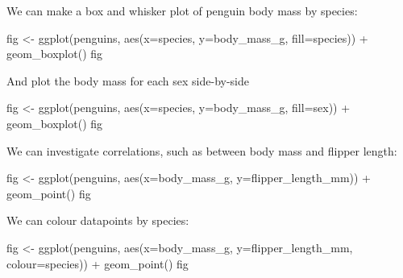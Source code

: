 \documentclass[
  letterpaper,
  DIV=11,
  numbers=noendperiod]{scrreprt}
\newenvironment{Shaded}{\begin{snugshade}}{\end{snugshade}}
\newcommand{\AttributeTok}[1]{\textcolor[rgb]{0.40,0.45,0.13}{#1}}
\newcommand{\FunctionTok}[1]{\textcolor[rgb]{0.28,0.35,0.67}{#1}}
\newcommand{\NormalTok}[1]{\textcolor[rgb]{0.00,0.23,0.31}{#1}}
\newcommand{\OtherTok}[1]{\textcolor[rgb]{0.00,0.23,0.31}{#1}}
\newcommand{\SpecialCharTok}[1]{\textcolor[rgb]{0.37,0.37,0.37}{#1}}
\begin{document}
\begin{tcolorbox}
We can make a box and whisker plot of penguin body mass by species:

\begin{Shaded}
\begin{Highlighting}[]
\NormalTok{fig }\OtherTok{\textless{}{-}} \FunctionTok{ggplot}\NormalTok{(penguins, }\FunctionTok{aes}\NormalTok{(}\AttributeTok{x=}\NormalTok{species, }\AttributeTok{y=}\NormalTok{body\_mass\_g, }\AttributeTok{fill=}\NormalTok{species)) }\SpecialCharTok{+}
         \FunctionTok{geom\_boxplot}\NormalTok{()}
\NormalTok{fig}
\end{Highlighting}
\end{Shaded}

And plot the body mass for each sex side-by-side

\begin{Shaded}
\begin{Highlighting}[]
\NormalTok{fig }\OtherTok{\textless{}{-}} \FunctionTok{ggplot}\NormalTok{(penguins, }\FunctionTok{aes}\NormalTok{(}\AttributeTok{x=}\NormalTok{species, }\AttributeTok{y=}\NormalTok{body\_mass\_g, }\AttributeTok{fill=}\NormalTok{sex)) }\SpecialCharTok{+}
         \FunctionTok{geom\_boxplot}\NormalTok{()}
\NormalTok{fig}
\end{Highlighting}
\end{Shaded}

We can investigate correlations, such as between body mass and flipper
length:

\begin{Shaded}
\begin{Highlighting}[]
\NormalTok{fig }\OtherTok{\textless{}{-}} \FunctionTok{ggplot}\NormalTok{(penguins, }\FunctionTok{aes}\NormalTok{(}\AttributeTok{x=}\NormalTok{body\_mass\_g, }\AttributeTok{y=}\NormalTok{flipper\_length\_mm)) }\SpecialCharTok{+}
         \FunctionTok{geom\_point}\NormalTok{()}
\NormalTok{fig}
\end{Highlighting}
\end{Shaded}

We can colour datapoints by species:

\begin{Shaded}
\begin{Highlighting}[]
\NormalTok{fig }\OtherTok{\textless{}{-}} \FunctionTok{ggplot}\NormalTok{(penguins, }\FunctionTok{aes}\NormalTok{(}\AttributeTok{x=}\NormalTok{body\_mass\_g, }\AttributeTok{y=}\NormalTok{flipper\_length\_mm, }\AttributeTok{colour=}\NormalTok{species)) }\SpecialCharTok{+}
         \FunctionTok{geom\_point}\NormalTok{()}
\NormalTok{fig}
\end{Highlighting}
\end{Shaded}


\end{tcolorbox}
\end{document}
